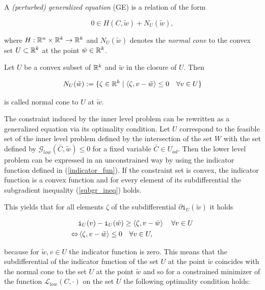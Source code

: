 A \emph{(perturbed) generalized equation} (GE) is a relation of the form

\[ 0 \in H(C,\tilde{w})+N_{U}(\tilde{w}), \]

where \(H:\mathbb{R}^n\times \mathbb{R}^k \to \mathbb{R}^k\) and \(N_{U}(\tilde{w})\) denotes the \emph{normal cone} to the convex set \(U \subset \mathbb{R}^k\) at the point \(\tilde{w}\in \mathbb{R}^k\).

\begin{definition}
	Let \(U\) be a convex subset of \(\mathbb{R}^k\) and \(\tilde{w}\) in the closure of \(U\). Then
	
	\begin{equation*}
		N_U(\tilde{w}) := \{\zeta\in \mathbb{R}^k \mid \left\langle \zeta,v-\tilde{w}\right\rangle \leq 0 \quad \forall v \in U \}
	\label{norm_cone}
	\end{equation*}
	
	is called normal cone to \(U\) at \(\tilde{w}\).
\end{definition}
 
The constraint induced by the inner level problem can be rewritten as a generalized equation via its optimality condition.
Let \(U\) correspond to the feasible set of the inner level problem defined by the intersection of the set \(W\) with the set defined by \(\mathcal{G}_{low}(\bar{C},\tilde{w})\leq 0\) for a fixed variable \(\bar{C} \in U_{ad} \).
Then the lower level problem can be expressed in an unconstrained way by using the indicator function defined in (\ref{indicator_fun}). If the constraint set is convex, the indicator function is a convex function and for every element of its subdifferential the subgradient inequality (\ref{subgr_ineq}) holds.

This yields that for all elements \(\zeta\) of the subdifferential \(\partial \mathtt{i}_U(\tilde{w})\) it holds

\begin{equation*}
\begin{split}
	&\mathtt{i}_U(v)-\mathtt{i}_U(\tilde{w}) \geq \left\langle \zeta, v-\tilde{w}\right\rangle \quad \forall v \in U \\
	\Leftrightarrow & \left\langle \zeta, v-\tilde{w}\right\rangle \leq 0 \quad \forall v \in U,
\end{split}
\end{equation*}

because for \(\tilde{w},v \in U\) the indicator function is zero. This means that the subdifferential of the indicator function of the set \(U\) at the point \(\tilde{w}\) coincides with the normal cone to the set \(U\) at the point \(\tilde{w}\) and so for a constrained minimizer of the function \(\mathcal{L}_{low}(C,\cdot)\) on the set \(U\) the following optimality condition holds:

